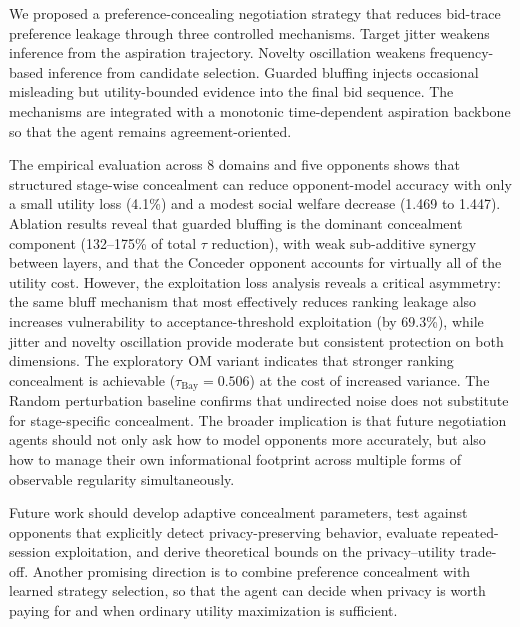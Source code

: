 \documentclass[runningheads]{llncs}
\begin{document}
We proposed a preference-concealing negotiation strategy that reduces bid-trace preference leakage through three controlled mechanisms. Target jitter weakens inference from the aspiration trajectory. Novelty oscillation weakens frequency-based inference from candidate selection. Guarded bluffing injects occasional misleading but utility-bounded evidence into the final bid sequence. The mechanisms are integrated with a monotonic time-dependent aspiration backbone so that the agent remains agreement-oriented.

The empirical evaluation across 8 domains and five opponents shows that structured stage-wise concealment can reduce opponent-model accuracy with only a small utility loss
(4.1\%) and a modest social welfare decrease (1.469 to 1.447). Ablation results reveal that guarded bluffing is the dominant concealment component
(132--175\% of total $\tau$ reduction), with weak sub-additive synergy between layers, and that the Conceder opponent accounts for virtually all of the utility cost. However, the exploitation loss analysis reveals a critical asymmetry: the same bluff mechanism that most effectively reduces ranking leakage also increases vulnerability to acceptance-threshold exploitation (by 69.3\%), while jitter and novelty oscillation provide moderate but consistent protection on both dimensions. The exploratory OM variant indicates that stronger ranking concealment is achievable
($\tau_{\text{Bay}} = 0.506$) at the cost of increased variance. The Random perturbation baseline confirms that undirected noise does not substitute for stage-specific concealment. The broader implication is that future negotiation agents should not only ask how to model opponents more accurately, but also how to manage their own informational footprint across multiple forms of observable regularity simultaneously.

Future work should develop adaptive concealment parameters, test against opponents that explicitly detect privacy-preserving behavior, evaluate repeated-session exploitation, and derive theoretical bounds on the privacy--utility trade-off. Another promising direction is to combine preference concealment with learned strategy selection, so that the agent can decide when privacy is worth paying for and when ordinary utility maximization is sufficient.



\end{document}
